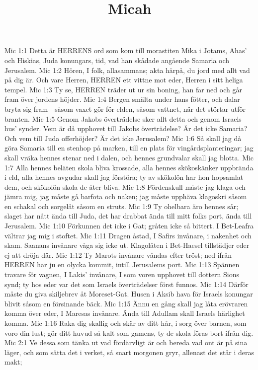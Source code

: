

\title{Micah}

Mic 1:1  Detta är HERRENS ord som kom till morastiten Mika i Jotams, Ahas' och Hiskias, Juda konungars, tid, vad han skådade angående Samaria och Jerusalem.
Mic 1:2  Hören, I folk, allasammans; akta härpå, du jord med allt vad på dig är. Och vare Herren, HERREN ett vittne mot eder, Herren i sitt heliga tempel.
Mic 1:3  Ty se, HERREN träder ut ur sin boning, han far ned och går fram över jordens höjder.
Mic 1:4  Bergen smälta under hans fötter, och dalar bryta sig fram - såsom vaxet gör för elden, såsom vattnet, när det störtar utför branten.
Mic 1:5  Genom Jakobs överträdelse sker allt detta och genom Israels hus' synder. Vem är då upphovet till Jakobs överträdelse? Är det icke Samaria? Och vem till Juda offerhöjder? Är det icke Jerusalem?
Mic 1:6  Så skall jag då göra Samaria till en stenhop på marken, till en plats för vingårdsplanteringar; jag skall vräka hennes stenar ned i dalen, och hennes grundvalar skall jag blotta.
Mic 1:7  Alla hennes beläten skola bliva krossade, alla hennes skökoskänker uppbrända i eld, alla hennes avgudar skall jag förstöra; ty av skökolön har hon hopsamlat dem, och skökolön skola de åter bliva.
Mic 1:8  Fördenskull måste jag klaga och jämra mig, jag måste gå barfota och naken; jag måste upphäva klagoskri såsom en schakal och sorgelåt såsom en struts.
Mic 1:9  Ty ohelbara äro hennes sår; slaget har nått ända till Juda, det har drabbat ända till mitt folks port, ända till Jerusalem.
Mic 1:10  Förkunnen det icke i Gat; gråten icke så bittert. I Bet-Leafra vältrar jag mig i stoftet.
Mic 1:11  Dragen åstad, I Safirs invånare, i nakenhet och skam. Saanans invånare våga sig icke ut. Klagolåten i Bet-Haesel tillstädjer eder ej att dröja där.
Mic 1:12  Ty Marots invånare våndas efter tröst; ned ifrån HERREN har ju en olycka kommit, intill Jerusalems port.
Mic 1:13  Spännen travare för vagnen, I Lakis' invånare, I som voren upphovet till dottern Sions synd; ty hos eder var det som Israels överträdelser först funnos.
Mic 1:14  Därför måste du giva skiljebrev åt Moreset-Gat. Husen i Aksib hava för Israels konungar blivit såsom en försinande bäck.
Mic 1:15  Ännu en gång skall jag låta erövraren komma över eder, I Maresas invånare. Ända till Adullam skall Israels härlighet komma.
Mic 1:16  Raka dig skallig och skär av ditt hår, i sorg över barnen, som voro din lust; gör ditt huvud så kalt som gamens, ty de skola föras bort ifrån dig.
Mic 2:1  Ve dessa som tänka ut vad fördärvligt är och bereda vad ont är på sina läger, och som sätta det i verket, så snart morgonen gryr, allenast det står i deras makt;
